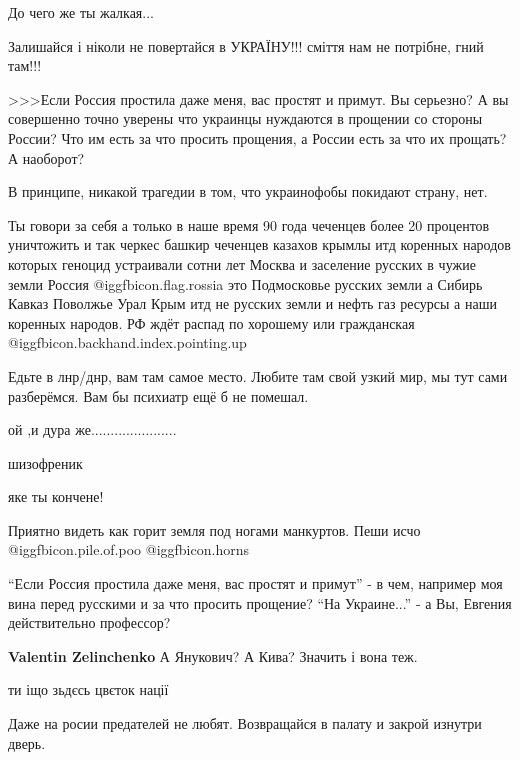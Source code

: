 \begin{itemize}
До чего же ты жалкая...

Залишайся і ніколи не повертайся в УКРАЇНУ!!! сміття нам не потрібне, гний там!!!

>>>Если Россия простила даже меня, вас простят и примут.
Вы серьезно? А вы совершенно точно уверены что украинцы нуждаются в прощении со стороны России? Что им есть за что просить прощения, а России есть за что их прощать? А наоборот?

В принципе, никакой трагедии в том, что украинофобы покидают страну, нет.


Ты говори за себя а только в наше время 90 года чеченцев более 20 процентов
уничтожить и так черкес башкир чеченцев казахов крымлы итд коренных народов
которых геноцид устраивали сотни лет Москва и заселение русских в чужие земли
Россия @igg{fbicon.flag.rossia} это Подмосковье русских земли а Сибирь Кавказ Поволжье Урал Крым
итд не русских земли и нефть газ ресурсы а наши коренных народов. РФ ждёт
распад по хорошему или гражданская  @igg{fbicon.backhand.index.pointing.up} 


Едьте в лнр/днр, вам там самое место. Любите там свой узкий мир, мы тут сами разберёмся. Вам бы психиатр ещё б не помешал.

ой ,и дура же......................

шизофреник

яке ты кончене!

Приятно видеть как горит земля под ногами манкуртов. Пеши исчо  @igg{fbicon.pile.of.poo}  @igg{fbicon.horns} 


\enquote{Если Россия простила даже меня, вас простят и примут} - в чем, например моя
вина перед русскими и за что просить прощение? \enquote{На Украине...} - а Вы, Евгения
действительно профессор?

\begin{itemize} %
\textbf{Valentin Zelinchenko} А Янукович? А Кива? Значить і вона теж.
\end{itemize} %

ти іщо зьдєсь цвєток нації

Даже на росии предателей не любят. Возвращайся в палату и закрой изнутри дверь.


\end{itemize}
